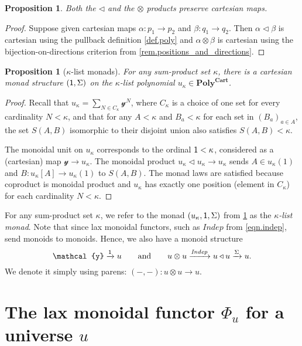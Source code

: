\documentclass[11pt, one side, article]{memoir}
\theoremstyle{definition}
\theoremstyle{plain}
\newtheorem{proposition}[definitionx]{Proposition}
\newcommand{\Cat}[1]{\mathbf{#1}}%
\newcommand{\Fun}[1]{\mathit{#1}}%
\newcommand{\To}[2][]{\xrightarrow[#1]{#2}}
\newcommand{\yon}{\mathcal{y}}
\newcommand{\poly}{\Cat{Poly}}
\newcommand{\polycart}{\poly^{\Cat{Cart}}}
\newcommand{\0}{\textsf{0}}
\newcommand{\1}{\tn{\textsf{1}}}
\newcommand{\tri}{\mathbin{\triangleleft}}
\newcommand{\indep}{\Fun{Indep}}
\newcommand{\qqand}{\qquad\text{and}\qquad}
\begin{document}
\begin{proposition}\label{prop.tri_dir_cartesian}
Both the $\tri$ and the $\otimes$ products preserve cartesian maps.
\end{proposition}
\begin{proof}
Suppose given cartesian maps $\alpha\colon p_1\to p_2$ and $\beta\colon q_1\to q_2$. Then $\alpha\tri\beta$ is cartesian using the pullback definition \cref{def.poly} and $\alpha\otimes\beta$ is cartesian using the bijection-on-directions criterion from \cref{rem.positions_and_directions}.
\end{proof}

\begin{proposition}[$\kappa$-list monads]\label{prop.list_monad}
For any sum-product set $\kappa$, there is a cartesian monad structure $(\1,\Sigma)$ on the $\kappa$-list polynomial $u_\kappa\in\polycart$.
\end{proposition}
\begin{proof}
Recall that $u_\kappa=\sum_{N\in C_\kappa}\yon^N$, where $C_\kappa$ is a choice of one set for every cardinality $N<\kappa$, and that for any $A<\kappa$ and $B_a<\kappa$ for each set in $(B_a)_{a\in A}$, the set $S(A,B)$ isomorphic to their disjoint union also satisfies $S(A,B)<\kappa$. 

The monoidal unit on $u_\kappa$ corresponds to the ordinal $\1<\kappa$, considered as a (cartesian) map $\yon\to u_\kappa$. The monoidal product $u_\kappa\tri u_\kappa\to u_\kappa$ sends $A\in u_\kappa(1)$ and $B\colon u_\kappa[A]\to u_\kappa(1)$ to $S(A,B)$. The monad laws are satisfied because coproduct is monoidal product and $u_\kappa$ has exactly one position (element in $C_\kappa$) for each cardinality $N<\kappa$. 
\end{proof}

For any sum-product set $\kappa$, we refer to the monad $(u_\kappa,\1,\Sigma)$ from \cref{prop.list_monad} as the \emph{$\kappa$-list monad}. Note that since lax monoidal functors, such as $\indep$ from \eqref{eqn.indep}, send monoids to monoids. Hence, we also have a monoid structure 
\begin{equation}\label{eqn.otimes_monoid}
	\yon\To{\1} u
	\qqand
	u\otimes u\To{\indep} u\tri u\To{\Sigma}u.
\end{equation}
We denote it simply using parens: $(-,-)\colon u\otimes u\to u$.


\chapter{The lax monoidal functor $\Phi_u$ for a universe $u$}
\end{document}
